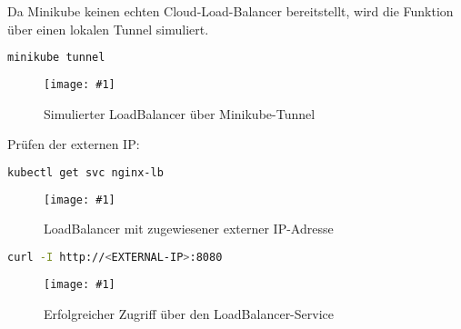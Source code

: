 \documentclass[BMR,Seminar,ngerman,IEEE]{twbook}
\newcommand{\screenshotH}[3]{%
  \begin{figure}[H]
    \centering
    \texttt{[image: \#1]}%
    \caption{#2}%
    \label{fig:#3}%
  \end{figure}%
}
\begin{document}
Da Minikube keinen echten Cloud-Load-Balancer bereitstellt, wird die Funktion über einen lokalen Tunnel simuliert.
\begin{lstlisting}[language=bash,caption={Start des Minikube-Tunnels (neues Terminal)}]
minikube tunnel
\end{lstlisting}
\screenshotH{minikube_tunnel.png}{Simulierter LoadBalancer über Minikube-Tunnel}{minikube-tunnel}
\FloatBarrier

Prüfen der externen IP:
\begin{lstlisting}[language=bash]
kubectl get svc nginx-lb
\end{lstlisting}
\screenshotH{minikube_get_svc_loadbalancer.png}{LoadBalancer mit zugewiesener externer IP-Adresse}{loadbalancer-ip}
\FloatBarrier

\begin{lstlisting}[language=bash,caption={Zugriff über die externe IP}]
curl -I http://<EXTERNAL-IP>:8080
\end{lstlisting}
\screenshotH{minikube_curl_loadbalancer.png}{Erfolgreicher Zugriff über den LoadBalancer-Service}{loadbalancer-access}
\FloatBarrier

\end{document}
